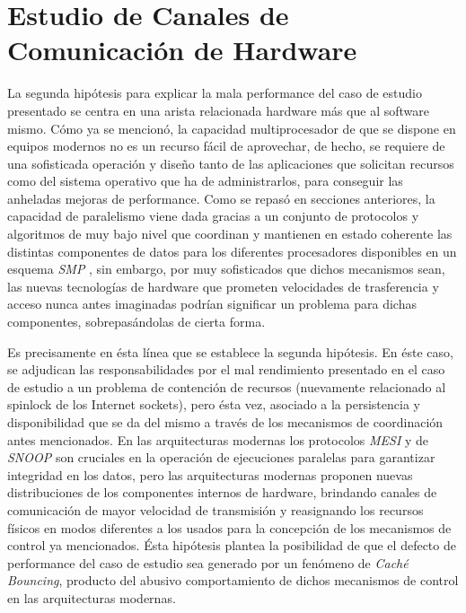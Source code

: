 \chapter{Estudio de Canales de Comunicación de Hardware}
La segunda hipótesis para explicar la mala performance del caso de estudio presentado se centra en una arista relacionada hardware más que al software mismo. Cómo ya se mencionó, la capacidad multiprocesador de que se dispone en equipos modernos no es un recurso fácil de aprovechar, de hecho, se requiere de una sofisticada operación y diseño tanto de las aplicaciones que solicitan recursos como del sistema operativo que ha de administrarlos, para conseguir las anheladas mejoras de performance. Como se repasó en secciones anteriores, la capacidad de paralelismo viene dada gracias a un conjunto de protocolos y algoritmos de muy bajo nivel que coordinan y mantienen en estado coherente las distintas componentes de datos para los diferentes procesadores disponibles en un esquema \emph{SMP} \cite{paper:MESI, paper:snoop}, sin embargo, por muy sofisticados que dichos mecanismos sean, las nuevas tecnologías de hardware que prometen velocidades de trasferencia y acceso nunca antes imaginadas podrían significar un problema para dichas componentes, sobrepasándolas de cierta forma.

Es precisamente en ésta línea que se establece la segunda hipótesis. En éste caso, se adjudican las responsabilidades por el mal rendimiento presentado en el caso de estudio a un problema de contención de recursos (nuevamente relacionado al spinlock de los Internet sockets), pero ésta vez, asociado a la persistencia y disponibilidad que se da del mismo a través de los mecanismos de coordinación antes mencionados. En las arquitecturas modernas los protocolos \emph{MESI} y de \emph{SNOOP} son cruciales en la operación de ejecuciones paralelas para garantizar integridad en los datos, pero las arquitecturas modernas proponen nuevas distribuciones de los componentes internos de hardware, brindando canales de comunicación de mayor velocidad de transmisión y reasignando los recursos físicos en modos diferentes a los usados para la concepción de los mecanismos de control ya mencionados. Ésta hipótesis plantea la posibilidad de que el defecto de performance del caso de estudio sea generado por un fenómeno de \emph{Caché Bouncing}, producto del abusivo comportamiento de dichos mecanismos de control en las arquitecturas modernas.

